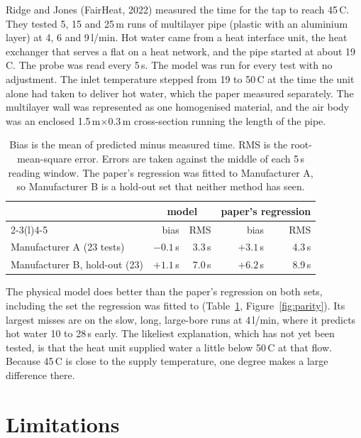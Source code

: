 \documentclass[a4paper,justified]{tufte-handout}
\newcommand{\degC}{\,\textdegree{}C}
\newcommand{\lpm}{\,l/min}
\begin{document}
Ridge and Jones (FairHeat, 2022) measured the time for the tap to reach
45\degC{}. They tested 5, 15 and 25\,m runs of multilayer pipe (plastic with an
aluminium layer) at 4, 6 and 9\lpm{}. Hot water came from a heat interface
unit, the heat exchanger that serves a flat on a heat network, and the pipe
started at about 19\degC{}. The probe was read every 5\,s. The model was run for
every test with no adjustment. The inlet temperature stepped from 19 to
50\degC{} at the time the unit alone had taken to deliver hot water, which the
paper measured separately. The multilayer wall was represented as one
homogenised material, and the air body was an enclosed 1.5\,m$\times$0.3\,m
cross-section running the length of the pipe.

\begin{table}[h]
\centering
\footnotesize
\begin{tabular}{@{}lrrrr@{}}
\toprule
 & \multicolumn{2}{c}{model} & \multicolumn{2}{c}{paper's regression} \\
 \cmidrule(lr){2-3}\cmidrule(l){4-5}
 & bias & RMS & bias & RMS \\
\midrule
Manufacturer A (23 tests) & $-0.1$\,s & 3.3\,s & $+3.1$\,s & 4.3\,s \\
Manufacturer B, hold-out (23) & $+1.1$\,s & 7.0\,s & $+6.2$\,s & 8.9\,s \\
\bottomrule
\end{tabular}
\caption{Bias is the mean of predicted minus measured time. RMS is the
root-mean-square error. Errors are taken against the middle of each 5\,s
reading window. The paper's regression was fitted to Manufacturer A, so
Manufacturer B is a hold-out set that neither method has seen.}
\label{tab:errors}
\end{table}

The physical model does better than the paper's regression on both sets,
including the set the regression was fitted to (Table~\ref{tab:errors},
Figure~\ref{fig:parity}). Its largest misses are on the slow, long, large-bore
runs at 4\lpm{}, where it predicts hot water 10 to 28\,s early. The likeliest
explanation, which has not yet been tested, is that the heat unit supplied
water a little below 50\degC{} at that flow. Because 45\degC{} is close to the
supply temperature, one degree makes a large difference there.

\section{Limitations}
\end{document}
